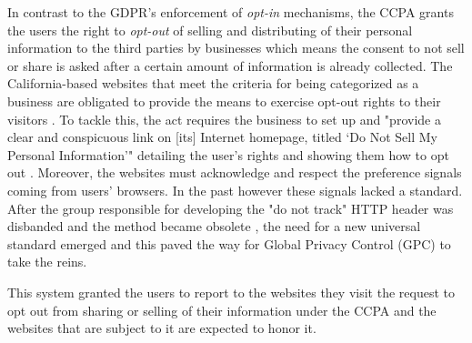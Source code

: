 In contrast to the GDPR's enforcement of \emph{opt-in} mechanisms, the CCPA grants the users the right to \emph{opt-out} of selling and distributing of their personal information to the third parties by businesses which means the consent to not sell or share is asked after a certain amount of information is already collected. 
The California-based websites that meet the criteria for being categorized as a business are obligated to provide the means to exercise opt-out rights to their visitors \cite[§1798.120 (a)–(b)]{ccpa}.
To tackle this, the act requires the business to set up and "provide a clear and conspicuous link on [its] Internet homepage, titled ‘Do Not Sell My Personal Information’" detailing the user's rights and showing them how to opt out \cite[§1798.135 (a)]{ccpa}. 
Moreover, the websites must acknowledge and respect the preference signals coming from users' browsers.
In the past however these signals lacked a standard.
After the group responsible for developing the "do not track" HTTP header was disbanded and the method became obsolete \cite{iapp}, the need for a new universal standard emerged and this paved the way for Global Privacy Control (GPC) to take the reins.

This system granted the users to report to the websites they visit the request to opt out from sharing or selling of their information under the CCPA and the websites that are subject to it are expected to honor it. 




